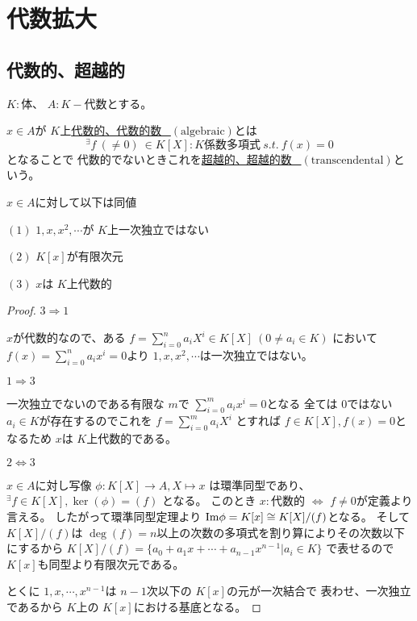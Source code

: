 \documentclass[../master_galois_theory]{subfiles}
\begin{document}
\setcounter{section}{5}

\section{代数拡大}

\subsection{代数的、超越的}


$K:$体、 $A:K-$代数とする。

\begin{defi}
  $x \in A$が $K$上\underline{代数的、代数的数 \  $(\mathrm{algebraic})$}とは
  \[
  {}^\exists f \  (\neq 0) \  \in K[X]:K係数多項式 \  s.t. \  f(x) = 0
  \]
  となることで
  代数的でないときこれを\underline{超越的、超越的数 \  $(\mathrm{transcendental})$}という。
\end{defi}

\begin{prop} \label{prop:yuugenzigen}
  $x \in A$に対して以下は同値

  $(1)$ $1 , x , x^2 , \cdots$が $K$上一次独立ではない

  $(2)$ $K[x]$が有限次元

  $(3)$ $x$は $K$上代数的
\end{prop}

\begin{proof}
  $3 \Rightarrow 1$

  $x$が代数的なので、ある $f = \sum_{i=0}^n a_i X^i \in K[X] \  (0 \neq a_i \in K)$
  において $f(x) = \sum_{i=0}^n a_i x^i = 0$より
  $1 , x , x^2 , \cdots$は一次独立ではない。

  $1 \Rightarrow 3$

  一次独立でないのである有限な $m$で $\sum_{i=0}^m a_i x^i = 0$となる
  全ては $0$ではない $a_i \in K$が存在するのでこれを $f = \sum_{i=0}^m a_i X^i$
  とすれば $f \in K[X] , f(x) = 0$となるため $x$は $K$上代数的である。

  $2 \Leftrightarrow 3$

  $x \in A$に対し写像 $\phi : K[X] \longrightarrow A , X \longmapsto x$
  は環準同型であり、
  ${}^\exists f \in K[X] , \ker(\phi) = (f)$
  となる。
  このとき $x:$代数的 $\Leftrightarrow$ $f \neq 0$が定義より言える。
  したがって環準同型定理より
  $\mathrm{Im}{\phi} = K[x] \cong K[X]/(f)$となる。
  そして $K[X]/(f)$は $\deg(f) = n$以上の次数の多項式を割り算によりその次数以下にするから
  $K[X]/(f) = \{ a_0 + a_1 x + \cdots + a_{n-1} x^{n-1} | a_i \in K \}$
  で表せるので $K[x]$も同型より有限次元である。

  とくに $1 , x , \cdots , x^{n-1}$は $n-1$次以下の $K[x]$の元が一次結合で
  表わせ、一次独立であるから
  $K$上の $K[x]$における基底となる。

\end{proof}
\end{document}
